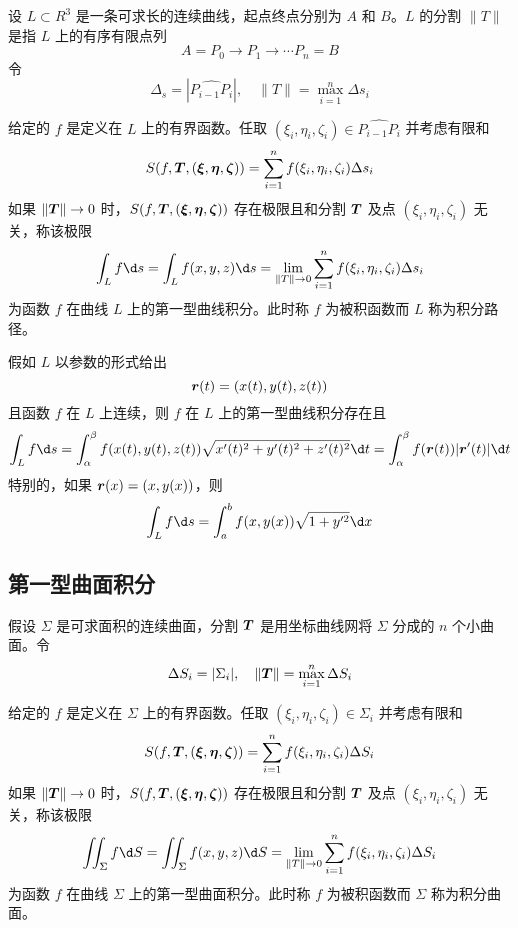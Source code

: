 设 $L \subset R^3$ 是一条可求长的连续曲线，起点终点分别为 $A$ 和 $B$。$L$ 的分割 $\|T\|$ 是指 $L$ 上的有序有限点列
\[ A = P_0 \to P_1 \to \cdots P_n = B \]
令
\[ \Delta_s = \left| \widehat{P_{i-1}P_i} \right|, \quad \|T\| = \max_{i=1}^n \Delta s_i \]

\begin{definition}
	给定的 $f$ 是定义在 $L$ 上的有界函数。任取 $(\xi_i, \eta_i, \zeta_i) \in \widehat{P_{i-1} P_i}$ 并考虑有限和
	\[ S(f, \boldsymbol{T}, (\boldsymbol{\xi}, \boldsymbol{\eta}, \boldsymbol{\zeta})) = \sum_{i=1}^{n} f(\xi_i, \eta_i, \zeta_i)\Delta s_i \]
	如果 $\|\boldsymbol{T}\| \to 0$ 时，$S(f, \boldsymbol{T}, (\boldsymbol{\xi}, \boldsymbol{\eta}, \boldsymbol{\zeta}))$ 存在极限且和分割 $\boldsymbol{T}$ 及点 $(\xi_i, \eta_i, \zeta_i)$ 无关，称该极限
	\[ \int_L f \d s = \int_{L} f(x, y, z) \d s = \lim_{\|T\| \to 0} \sum_{i=1}^{n} f(\xi_i, \eta_i, \zeta_i) \Delta s_i \]
	为函数 $f$ 在曲线 $L$ 上的第一型曲线积分。此时称 $f$ 为被积函数而 $L$ 称为积分路径。
\end{definition}

假如 $L$ 以参数的形式给出
\[ \boldsymbol{r}(t) = (x(t), y(t), z(t)) \]
且函数 $f$ 在 $L$ 上连续，则 $f$ 在 $L$ 上的第一型曲线积分存在且
\[ \int_L f \d s = \int_{\alpha}^{\beta}f(x(t), y(t), z(t)) \sqrt{x'(t)^2 + y'(t)^2 + z'(t)^2} \d t = \int_{\alpha}^\beta f(\vbf{r}(t))|\vbf{r}'(t)| \d t \]
特别的，如果 $\boldsymbol{r}(x) = (x, y(x))$，则
\[ \int_L f \d s = \int_{a}^{b} f(x, y(x)) \sqrt{1 + y'^2} \d x \]

\subsection{第一型曲面积分}

假设 $\Sigma$ 是可求面积的连续曲面，分割 $\boldsymbol{T}$ 是用坐标曲线网将 $\Sigma$ 分成的 $n$ 个小曲面。令
\[ \Delta S_i = |\Sigma_i|, \quad \|\boldsymbol{T}\| = \max_{i=1}^n \Delta S_i \]

\begin{definition}
	给定的 $f$ 是定义在 $\Sigma$ 上的有界函数。任取 $(\xi_i, \eta_i, \zeta_i) \in \Sigma_i$ 并考虑有限和
	\[ S(f, \boldsymbol{T}, (\boldsymbol{\xi}, \boldsymbol{\eta}, \boldsymbol{\zeta})) = \sum_{i=1}^{n} f(\xi_i, \eta_i, \zeta_i)\Delta S_i \]
	如果 $\|\boldsymbol{T}\| \to 0$ 时，$S(f, \boldsymbol{T}, (\boldsymbol{\xi}, \boldsymbol{\eta}, \boldsymbol{\zeta}))$ 存在极限且和分割 $\boldsymbol{T}$ 及点 $(\xi_i, \eta_i, \zeta_i)$ 无关，称该极限
	\[ \iint_\Sigma f \d S = \iint_{\Sigma} f(x, y, z) \d S = \lim_{\|T\| \to 0} \sum_{i=1}^{n} f(\xi_i, \eta_i, \zeta_i) \Delta S_i \]
	为函数 $f$ 在曲线 $\Sigma$ 上的第一型曲面积分。此时称 $f$ 为被积函数而 $\Sigma$ 称为积分曲面。
\end{definition}

